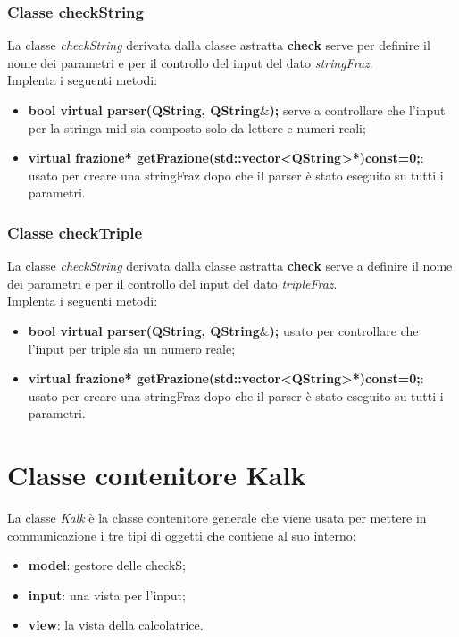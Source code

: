 \documentclass[a4paper,10pt]{article}
\begin{document}
    \subsubsection{Classe checkString}
        La classe  \textit{checkString} derivata dalla classe astratta \textbf{check} serve per definire il nome dei parametri e per il controllo del input del dato \textit{stringFraz}.
        \\Implenta i seguenti metodi:
        \begin{itemize}
            \item \textbf{bool virtual parser(QString, QString$\&$);} serve a controllare che l'input per la stringa mid sia composto solo da lettere e numeri reali;
            \item \textbf{virtual frazione* getFrazione(std::vector<QString>*)const=0;}: usato per creare una stringFraz dopo che il parser è stato eseguito su tutti i parametri. 
        \end{itemize}
    \subsubsection{Classe checkTriple}
        La classe \textit{checkString} derivata dalla classe astratta \textbf{check} serve a definire il nome dei parametri e per il controllo del input del dato \textit{tripleFraz}.
        \\Implenta i seguenti metodi:
        \begin{itemize}
            \item \textbf{bool virtual parser(QString, QString$\&$);} usato per controllare che l'input per triple sia un numero reale;
            \item \textbf{virtual frazione* getFrazione(std::vector<QString>*)const=0;}: usato per creare una stringFraz dopo che il parser è stato eseguito su tutti i parametri.
        \end{itemize}
    \newpage
    \section{Classe contenitore Kalk}
        La classe \textit{Kalk} è la classe contenitore generale che viene usata per mettere in communicazione i tre tipi di oggetti che contiene al suo interno:
        \begin{itemize}
            \item \textbf{model}: gestore delle checkS;
            \item \textbf{input}: una vista per l'input;
            \item \textbf{view}: la vista della calcolatrice.
        \end{itemize}
\end{document}
